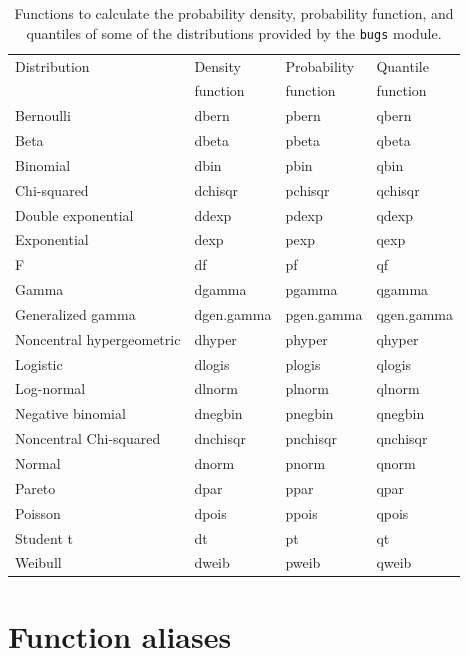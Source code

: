 \documentclass[11pt, a4paper, titlepage]{report}
\begin{document}
\begin{table}
\begin{center}
\begin{tabular}{llll}
\hline
Distribution & Density  & Probability & Quantile \\
             & function & function    & function \\
\hline
Bernoulli          & dbern     & pbern     & qbern \\
Beta               & dbeta     & pbeta     & qbeta \\
Binomial           & dbin      & pbin      & qbin \\
Chi-squared        & dchisqr   & pchisqr   & qchisqr \\
Double exponential & ddexp     & pdexp     & qdexp \\
Exponential        & dexp      & pexp      & qexp \\
F                  & df        & pf        & qf \\
Gamma              & dgamma    & pgamma    & qgamma \\
Generalized gamma  & dgen.gamma & pgen.gamma & qgen.gamma \\
Noncentral hypergeometric     & dhyper    & phyper    & qhyper \\
Logistic           & dlogis    & plogis    & qlogis \\
Log-normal         & dlnorm    & plnorm    & qlnorm \\
Negative binomial  & dnegbin   & pnegbin   & qnegbin \\
Noncentral Chi-squared & dnchisqr   & pnchisqr   & qnchisqr \\
Normal             & dnorm     & pnorm     & qnorm \\
Pareto             & dpar      & ppar      & qpar \\
Poisson            & dpois     & ppois     & qpois \\
Student t          & dt        & pt        & qt \\
Weibull            & dweib     & pweib     & qweib \\
\hline
\end{tabular}
\caption{Functions to calculate the probability density, probability
  function, and quantiles of some of the distributions provided by the
  \texttt{bugs} module. \label{table:dpq}}
\end{center}
\end{table}

\section{Function aliases}
\end{document}
